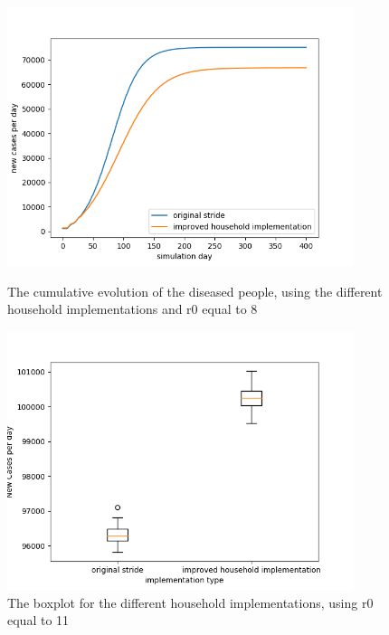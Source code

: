 \documentclass[runningheads]{llncs}
\begin{document}
	\begin{figure}
		\centering
		\includegraphics[width=0.9\textwidth]{household_r08_cumul.png}
		\caption{The cumulative evolution of the diseased people, using the different household implementations and r0 equal to 8}	
		\label{fig8}
		\includegraphics[width=0.9\textwidth]{household_r11_boxplot.png}	
		\caption{The boxplot for the different household implementations, using r0 equal to 11}
		\label{fig9}
	\end{figure}
\end{document}
